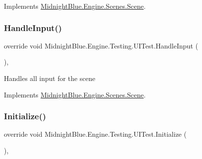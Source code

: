 Implements \hyperlink{class_midnight_blue_1_1_engine_1_1_scenes_1_1_scene_adbf0f6d758df9fc5e20f24f327599e67}{Midnight\+Blue.\+Engine.\+Scenes.\+Scene}.

\hypertarget{class_midnight_blue_1_1_engine_1_1_testing_1_1_u_i_test_a6c891f10050ee05fddb5c6d177e80782}{}\label{class_midnight_blue_1_1_engine_1_1_testing_1_1_u_i_test_a6c891f10050ee05fddb5c6d177e80782} 
\subsubsection{\texorpdfstring{Handle\+Input()}{HandleInput()}}
{\footnotesize\ttfamily override void Midnight\+Blue.\+Engine.\+Testing.\+U\+I\+Test.\+Handle\+Input (\begin{DoxyParamCaption}{ }\end{DoxyParamCaption})\hspace{0.3cm}{\ttfamily [inline]}, {\ttfamily [virtual]}}



Handles all input for the scene 



Implements \hyperlink{class_midnight_blue_1_1_engine_1_1_scenes_1_1_scene_a2f7849ef8976f9aeed0023448033b6fd}{Midnight\+Blue.\+Engine.\+Scenes.\+Scene}.

\hypertarget{class_midnight_blue_1_1_engine_1_1_testing_1_1_u_i_test_ad2b7f129febf8658c10c7881af15c847}{}\label{class_midnight_blue_1_1_engine_1_1_testing_1_1_u_i_test_ad2b7f129febf8658c10c7881af15c847} 
\subsubsection{\texorpdfstring{Initialize()}{Initialize()}}
{\footnotesize\ttfamily override void Midnight\+Blue.\+Engine.\+Testing.\+U\+I\+Test.\+Initialize (\begin{DoxyParamCaption}{ }\end{DoxyParamCaption})\hspace{0.3cm}{\ttfamily [inline]}, {\ttfamily [virtual]}}



